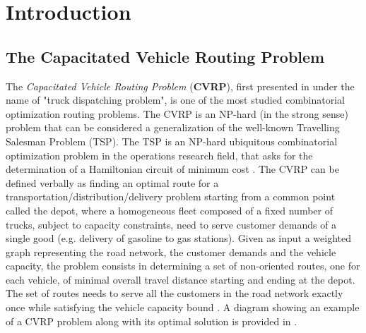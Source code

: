 \chapter{Introduction}
\label{sec:introduction-chapter}

\section{The Capacitated Vehicle Routing Problem}
\label{sec:intro-cvrp-problem}
The \textit{Capacitated Vehicle Routing Problem} (\textbf{CVRP}), first presented in \textcite{dantzig1959}
under the name of "truck dispatching problem",
is one of the most studied combinatorial optimization routing problems.
The CVRP is an NP-hard (in the strong sense) problem
that can be considered a generalization of the well-known Travelling Salesman Problem (TSP).
The TSP \parencite{flood1956}
is an NP-hard \parencite{garey1976planar} ubiquitous combinatorial optimization problem in the operations research field,
that asks for the determination of a Hamiltonian circuit of minimum cost
\parencite{croes1958, laporte1992,johnson1997,applegate2006,gutin2006,hoffman2013}.
The CVRP can be defined verbally as finding an optimal route for a transportation/distribution/delivery problem
starting from a common point called the depot,
where a homogeneous fleet composed of a fixed number of trucks, subject to capacity constraints,
need to serve customer demands of a single good (e.g. delivery of gasoline to gas stations).
Given as input a weighted graph representing the road network,
the customer demands and the vehicle capacity,
the problem consists in determining a set of non-oriented routes, one for each vehicle,
of minimal overall travel distance starting and ending at the depot.
The set of routes needs to serve all the customers in the road network exactly once
while satisfying the vehicle capacity bound \parencite{toth2014}.
A diagram showing an example of a CVRP problem along with its optimal solution
is provided in .

